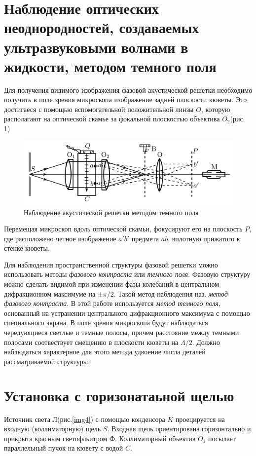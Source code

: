 \documentclass[a4paper,12pt]{article}
\begin{document}
\section{Наблюдение оптических неоднородностей, создаваемых ультразвуковыми волнами в жидкости, методом темного поля}
Для получения видимого изображения фазовой акустической решетки необходимо получить в поле зрения микроскопа изображение задней плоскости кюветы. Это достигаеся с помощью вспомогательной положительной линзы $O$, которую располагают на оптической скамье за фокальной плоскостью объектива $O_2$(рис. \ref{img3})

\begin{figure}[h]
\centering
\includegraphics[width=0.8\linewidth]{img3.png}
\caption{Наблюдение акустической решетки методом темного поля}
\label{img3}
\end{figure}

Перемещая микроскоп вдоль оптической скамьи, фокусируют его на плоскость $P$, где расположено четное изображение $a'b'$ предмета $ab$, вплотную прижатого к стенке кюветы.

Для наблюдения пространственной структуры фазовой решетки можно использовать методы \textit{фазового контраста} или \textit{темного поля}. Фазовую структуру можно сделать видимой при изменении фазы колебаний в центральном дифракционном максимуме на $\pm\pi/2$. Такой метод наблюдения наз. \textit{метод фазового контраста}. В этой работе используется \textit{метод темного поля}, основанный на устранении центрального дифракционного максимума с помощью специального экрана. В поле зрения микроскопа будут наблюдаться чередующиеся светлые и темные полосы, причем расстояние между темными полосами соотвествует смещению в плоскости кюветы на $\Lambda/2$. Должно наблюдаться характерное для этого метода удвоение числа деталей рассматриваемой структуры.

\section{Установка с горизонатаьной щелью}
Источник света $\text{Л}$(рис.\ref{img4}) с помощью конденсора $K$ проецируется на входную (коллиматорную) щель $S$. Входная щель ориентирована горизонтально и прикрыта красным светофльитром $\text{Ф}$. Коллиматорный объектив $O_1$ посылает параллельный пучок на кювету с водой $C$.
\end{document}
